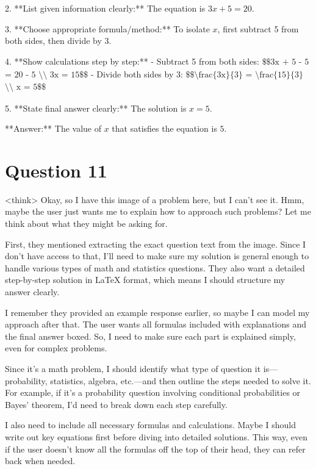 \documentclass[12pt]{article}
\begin{document}
2. **List given information clearly:** The equation is \(3x + 5 = 20\).

3. **Choose appropriate formula/method:** To isolate \(x\), first subtract 5 from both sides, then divide by 3.

4. **Show calculations step by step:**
   - Subtract 5 from both sides:
     \[
     3x + 5 - 5 = 20 - 5 \\
     3x = 15
     \]
   - Divide both sides by 3:
     \[
     \frac{3x}{3} = \frac{15}{3} \\
     x = 5
     \]

5. **State final answer clearly:** The solution is \(x = 5\).

**Answer:**
The value of \(x\) that satisfies the equation is \(\boxed{5}\).
\newpage

\section{Question 11}

<think>
Okay, so I have this image of a problem here, but I can't see it. Hmm, maybe the user just wants me to explain how to approach such problems? Let me think about what they might be asking for.

First, they mentioned extracting the exact question text from the image. Since I don't have access to that, I'll need to make sure my solution is general enough to handle various types of math and statistics questions. They also want a detailed step-by-step solution in LaTeX format, which means I should structure my answer clearly.

I remember they provided an example response earlier, so maybe I can model my approach after that. The user wants all formulas included with explanations and the final answer boxed. So, I need to make sure each part is explained simply, even for complex problems.

Since it's a math problem, I should identify what type of question it is—probability, statistics, algebra, etc.—and then outline the steps needed to solve it. For example, if it's a probability question involving conditional probabilities or Bayes' theorem, I'd need to break down each step carefully.

I also need to include all necessary formulas and calculations. Maybe I should write out key equations first before diving into detailed solutions. This way, even if the user doesn't know all the formulas off the top of their head, they can refer back when needed.
\end{document}
